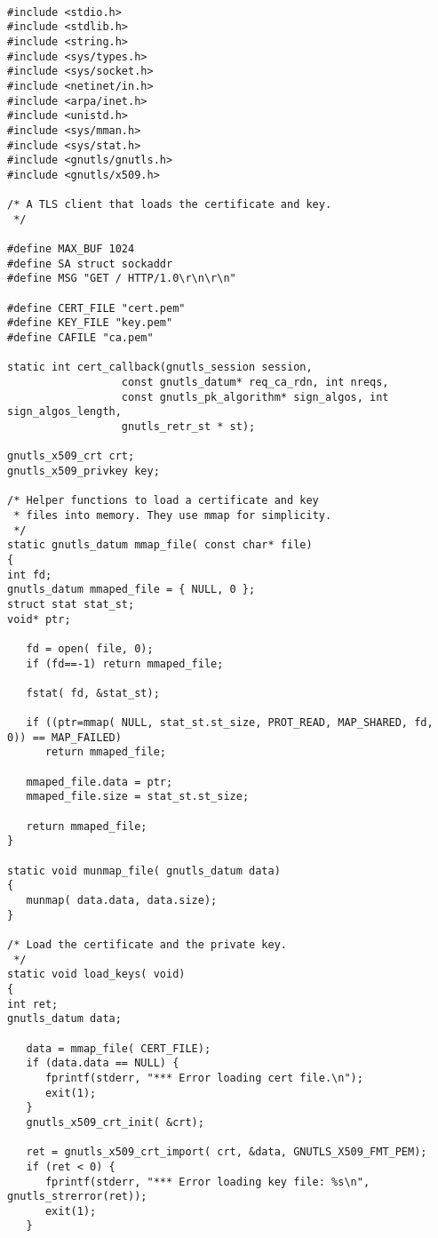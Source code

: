 \begin{verbatim}

#include <stdio.h>
#include <stdlib.h>
#include <string.h>
#include <sys/types.h>
#include <sys/socket.h>
#include <netinet/in.h>
#include <arpa/inet.h>
#include <unistd.h>
#include <sys/mman.h>
#include <sys/stat.h>
#include <gnutls/gnutls.h>
#include <gnutls/x509.h>

/* A TLS client that loads the certificate and key.
 */

#define MAX_BUF 1024
#define SA struct sockaddr
#define MSG "GET / HTTP/1.0\r\n\r\n"

#define CERT_FILE "cert.pem"
#define KEY_FILE "key.pem"
#define CAFILE "ca.pem"

static int cert_callback(gnutls_session session,
                  const gnutls_datum* req_ca_rdn, int nreqs,
                  const gnutls_pk_algorithm* sign_algos, int sign_algos_length,
                  gnutls_retr_st * st);

gnutls_x509_crt crt;
gnutls_x509_privkey key;

/* Helper functions to load a certificate and key
 * files into memory. They use mmap for simplicity.
 */
static gnutls_datum mmap_file( const char* file)
{
int fd;
gnutls_datum mmaped_file = { NULL, 0 };
struct stat stat_st;
void* ptr;

   fd = open( file, 0);
   if (fd==-1) return mmaped_file;
   
   fstat( fd, &stat_st);
   
   if ((ptr=mmap( NULL, stat_st.st_size, PROT_READ, MAP_SHARED, fd, 0)) == MAP_FAILED)
      return mmaped_file;
   
   mmaped_file.data = ptr;
   mmaped_file.size = stat_st.st_size;
   
   return mmaped_file;
}

static void munmap_file( gnutls_datum data)
{
   munmap( data.data, data.size);
}

/* Load the certificate and the private key.
 */
static void load_keys( void)
{
int ret;
gnutls_datum data;

   data = mmap_file( CERT_FILE);
   if (data.data == NULL) {
      fprintf(stderr, "*** Error loading cert file.\n");
      exit(1);
   }
   gnutls_x509_crt_init( &crt);
   
   ret = gnutls_x509_crt_import( crt, &data, GNUTLS_X509_FMT_PEM);
   if (ret < 0) {
      fprintf(stderr, "*** Error loading key file: %s\n", gnutls_strerror(ret));
      exit(1);
   }


\end{verbatim}
